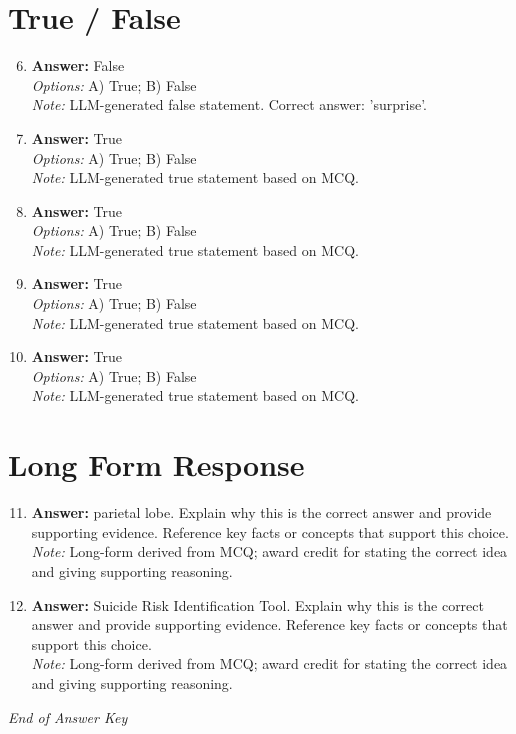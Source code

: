 \documentclass[12pt]{article}
\begin{document}
\section*{True / False}
\begin{enumerate}[label=\arabic*.]
\setcounter{enumi}{5}
\item \textbf{Answer:} False
\\ \textit{Options:} A) True; B) False
\\ \textit{Note:} LLM-generated false statement. Correct answer: 'surprise'.
\item \textbf{Answer:} True
\\ \textit{Options:} A) True; B) False
\\ \textit{Note:} LLM-generated true statement based on MCQ.
\item \textbf{Answer:} True
\\ \textit{Options:} A) True; B) False
\\ \textit{Note:} LLM-generated true statement based on MCQ.
\item \textbf{Answer:} True
\\ \textit{Options:} A) True; B) False
\\ \textit{Note:} LLM-generated true statement based on MCQ.
\item \textbf{Answer:} True
\\ \textit{Options:} A) True; B) False
\\ \textit{Note:} LLM-generated true statement based on MCQ.
\end{enumerate}

\section*{Long Form Response}
\begin{enumerate}[label=\arabic*.]
\setcounter{enumi}{10}
\item \textbf{Answer:} parietal lobe. Explain why this is the correct answer and provide supporting evidence. Reference key facts or concepts that support this choice.
\\ \textit{Note:} Long-form derived from MCQ; award credit for stating the correct idea and giving supporting reasoning.
\item \textbf{Answer:} Suicide Risk Identification Tool. Explain why this is the correct answer and provide supporting evidence. Reference key facts or concepts that support this choice.
\\ \textit{Note:} Long-form derived from MCQ; award credit for stating the correct idea and giving supporting reasoning.
\end{enumerate}

\vfill
\noindent\textit{End of Answer Key}
\end{document}
